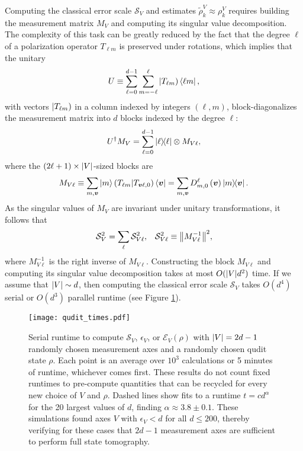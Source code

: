 \documentclass[notitlepage,twocolumn]{revtex4-2}
\newcommand{\p}[1]{\left(#1\right)} %
\renewcommand{\v}{\bm} %
\newcommand{\E}{\mathcal{E}}
\renewcommand{\S}{\mathcal{S}}
\def\oket#1{\mathinner{|{#1})}}
\def\obk#1{\mathinner{({#1})}}
\begin{document}
Computing the classical error scale $\S_V$ and estimates $\tilde\rho^V_k\approx\rho^V_k$ requires building the measurement matrix $M_V$ and computing its singular value decomposition.
The complexity of this task can be greatly reduced by the fact that the degree $\ell$ of a polarization operator $T_{\ell m}$ is preserved under rotations, which implies that the unitary
\begin{align}
  U \equiv \sum_{\ell=0}^{d-1} \sum_{m=-\ell}^\ell
  \oket{T_{\ell m}} \bra{\ell m},
  \label{eq:trans_basis}
\end{align}
with vectors $\oket{T_{\ell m}}$ in a column indexed by integers $\p{\ell,m}$, block-diagonalizes the measurement matrix into $d$ blocks indexed by the degree $\ell$:
\begin{align}
  U^\dag M_V = \sum_{\ell=0}^{d-1} \op{\ell} \otimes M_{V\ell},
\end{align}
where the $\p{2\ell+1}\times\abs{V}$-sized blocks are
\begin{align}
  M_{V\ell} \equiv \sum_{m,\v v} \ket{m} \obk{T_{\ell m}|T_{\v v\ell,0}} \bra{\v v}
  = \sum_{m,\v v} D^\ell_{m,0}\p{\v v} \op{m}{\v v}.
  \label{eq:block}
\end{align}
As the singular values of $M_V$ are invariant under unitary transformations, it follows that
\begin{align}
  \S_V^2 = \sum_\ell \S_{V\ell}^2,
  &&
  \S_{V\ell}^2 \equiv \norm{M_{V\ell}^{-1}}^2,
\end{align}
where $M_{V\ell}^{-1}$ is the right inverse of $M_{V\ell}$.
Constructing the block $M_{V\ell}$ and computing its singular value decomposition takes at most $O(\abs{V}d^2)$ time.
If we assume that $\abs{V}\sim d$, then computing the classical error scale $\S_V$ takes $O(d^4)$ serial or $O(d^3)$ parallel runtime (see Figure \ref{fig:times}).

\begin{figure}
  \centering
  \texttt{[image: qudit\_times.pdf]}
  \caption{Serial runtime to compute $\S_V$, $\epsilon_V$, or $\E_V\p{\rho}$ with $\abs{V}=2d-1$ randomly chosen measurement axes and a randomly chosen qudit state $\rho$.
    Each point is an average over $10^3$ calculations or 5 minutes of runtime, whichever comes first.
    These results do not count fixed runtimes to pre-compute quantities that can be recycled for every new choice of $V$ and $\rho$.
    Dashed lines show fits to a runtime $t=c d^\alpha$ for the 20 largest values of $d$, finding $\alpha\approx 3.8\pm0.1$.
    These simulations found axes $V$ with $\epsilon_V<d$ for all $d\le200$, thereby verifying for these cases that $2d-1$ measurement axes are sufficient to perform full state tomography.}
  \label{fig:times}
\end{figure}
\end{document}
